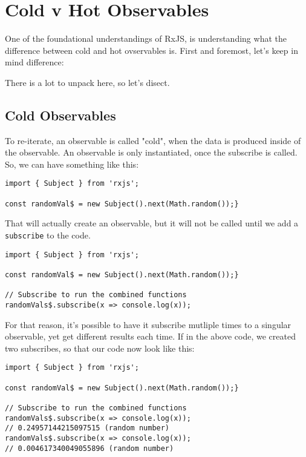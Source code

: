 \chapter{Cold v Hot Observables}
One of the foundational understandings of RxJS, is understanding what the 
difference between cold and hot ovservables is. First and foremost, let's 
keep in mind difference:
\begin{quote}
\end{quote}

There is a lot to unpack here, so let's disect. 

\section{Cold Observables}
To re-iterate, an observable is called "cold", when the data is produced inside of the observable. An observable is only instantiated, once the
subscribe is called. So, we can have something like this: 

\begin{lstlisting}[caption=observable without subscribe]
import { Subject } from 'rxjs';

const randomVal$ = new Subject().next(Math.random());}
\end{lstlisting}
That will actually create an observable, but it will not be called until we add a \lstinline{subscribe} to the code. 

\begin{lstlisting}[caption=observable with subscribe]
import { Subject } from 'rxjs';

const randomVal$ = new Subject().next(Math.random());}

// Subscribe to run the combined functions
randomVals$.subscribe(x => console.log(x));
\end{lstlisting}

For that reason, it's possible to have it subscribe mutliple times to a singular observable, yet get different results each time. If in the above 
code, we created two subscribes, so that our code now look like this: 
\begin{lstlisting}[caption=observable with two subscribes]
import { Subject } from 'rxjs';

const randomVal$ = new Subject().next(Math.random());}

// Subscribe to run the combined functions
randomVals$.subscribe(x => console.log(x));
// 0.24957144215097515 (random number)
randomVals$.subscribe(x => console.log(x));
// 0.004617340049055896 (random number)
\end{lstlisting}

